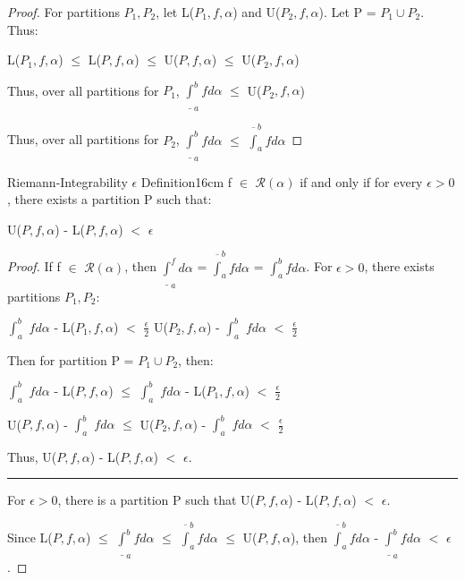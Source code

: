     \begin{proof}
        For partitions $P_1,P_2$, let L($P_1,f,\alpha$) and U($P_2,f,\alpha$).
        Let P = $P_1 \cup P_2$. Thus:

        \hspace{0.5cm}
        L($P_1,f,\alpha$)
        $\leq$ L($P,f,\alpha$)
        $\leq$ U($P,f,\alpha$)
        $\leq$ U($P_2,f,\alpha$)

        Thus, over all partitions for $P_1$,
        $\underline{\int}_a^b f d \alpha$
        $\leq$ U($P_2,f,\alpha$)

        Thus, over all partitions for $P_2$,
        $\underline{\int}_a^b f d \alpha$
        $\leq$ $\overline{\int}_a^b f d \alpha$
    \end{proof}

    \newpage



    \begin{wtheorem}{Riemann-Integrability $\epsilon$ Definition}{16cm}
        f $\in$ $\mathscr{R}(\alpha)$ if and only if for every $\epsilon > 0$,
        there exists a partition P such that:

        \hspace{0.5cm}
        U($P,f,\alpha$) - L($P,f,\alpha$) $<$ $\epsilon$        
    \end{wtheorem}

    \begin{proof}
        If f $\in$ $\mathscr{R}(\alpha)$, then
        $\underline{\int}_a^ f d \alpha$
        = $\overline{\int}_a^b f d \alpha$
        = $\int_a^b f d \alpha$.
        For $\epsilon > 0$, there exists partitions $P_1,P_2$:

        \hspace{0.5cm}
        $\int_a^b$ $f d \alpha$ - L($P_1,f,\alpha$) $<$ $\frac{\epsilon}{2}$
        \hspace{1cm}
        U($P_2,f,\alpha$) - $\int_a^b$ $f d \alpha$ $<$ $\frac{\epsilon}{2}$

        Then for partition P = $P_1 \cup P_2$, then:

        \hspace{0.5cm}
        $\int_a^b$ $f d \alpha$ - L($P,f,\alpha$)
        $\leq$ $\int_a^b$ $f d \alpha$ - L($P_1,f,\alpha$)
        $<$ $\frac{\epsilon}{2}$

        \hspace{0.5cm}
        U($P,f,\alpha$) - $\int_a^b$ $f d \alpha$
        $\leq$ U($P_2,f,\alpha$) - $\int_a^b$ $f d \alpha$
        $<$ $\frac{\epsilon}{2}$

        Thus, U($P,f,\alpha$) - L($P,f,\alpha$) $<$ $\epsilon$.

        \rule[0.1cm]{15cm}{0.01cm}

        For $\epsilon > 0$, there is a partition P such that
        U($P,f,\alpha$) - L($P,f,\alpha$) $<$ $\epsilon$.

        Since L($P,f,\alpha$) $\leq$ $\underline{\int}_a^b f d \alpha$
        $\leq$ $\overline{\int}_a^b f d \alpha$ $\leq$ U($P,f,\alpha$), then
        $\overline{\int}_a^b f d \alpha$ - $\underline{\int}_a^b f d \alpha$
        $<$ $\epsilon$.
    \end{proof}

